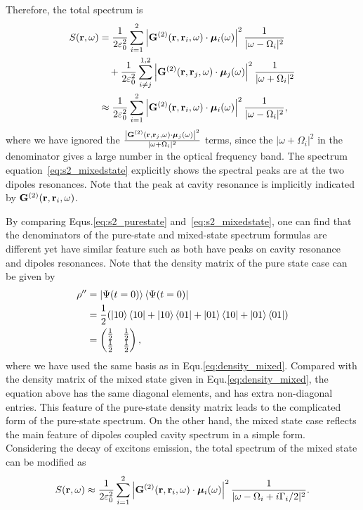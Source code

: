 Therefore, the total spectrum is
\begin{align}
S({\bf r},\omega)&=\frac{1}{2\varepsilon_0^2}\sum_{i=1}^2{\left| \mathbf{G}^{(2)}(\mathbf{r},\mathbf{r}_i,\omega)\cdot {\bm \mu}_i(\omega) \right|^2 \frac{1}{|\omega-\Omega_i|^2}} \nonumber \\
&\quad +\frac{1}{2\varepsilon_0^2}\sum_{i\neq j}^{1,2}{\left| \mathbf{G}^{(2)}(\mathbf{r},\mathbf{r}_j,\omega)\cdot {\bm \mu}_j(\omega) \right|^2 \frac{1}{|\omega+\Omega_i|^2}}\label{eq:s2_mixedstate0}\\
&\approx \frac{1}{2\varepsilon_0^2}\sum_{i=1}^2{\left| \mathbf{G}^{(2)}(\mathbf{r},\mathbf{r}_i,\omega)\cdot {\bm \mu}_i(\omega) \right|^2 \frac{1}{|\omega-\Omega_i|^2}}, \label{eq:s2_mixedstate}
\end{align}
where we have ignored the $\frac{\left| \mathbf{G}^{(2)}(\mathbf{r},\mathbf{r}_j,\omega)\cdot {\bm \mu}_j(\omega) \right|^2}{|\omega+\Omega_i|^2}$ terms, since the $|\omega+\Omega_i|^2$ in the denominator gives a large number in the optical frequency band. The spectrum equation~\ref{eq:s2_mixedstate} explicitly shows the spectral peaks are at the two dipoles resonances. Note that the peak at cavity resonance is implicitly indicated by $\mathbf{G}^{(2)}(\mathbf{r},\mathbf{r}_i,\omega)$.

By comparing Equs.\eqref{eq:s2_purestate} and~\eqref{eq:s2_mixedstate}, one can find that the denominators of the pure-state and mixed-state spectrum formulas are different yet have similar feature such as both have peaks on cavity resonance and dipoles resonances. Note that the density matrix of the pure state case can be given by
\begin{align}
\rho'' &=\mathinner{|{\Psi(t=0)}\rangle}\mathinner{\langle{\Psi(t=0)}|}\\
&=\frac{1}{2}(\mathinner{|{10}\rangle}\mathinner{\langle{10}|}+\mathinner{|{10}\rangle}\mathinner{\langle{01}|}+\mathinner{|{01}\rangle}\mathinner{\langle{10}|}+\mathinner{|{01}\rangle}\mathinner{\langle{01}|})\\
&=\left( \begin{matrix}
        \frac{1}{2} &   \frac{1}{2} \\
        \frac{1}{2}   &   \frac{1}{2} \end{matrix}\right),
\end{align}
where we have used the same basis as in  Equ.\eqref{eq:density_mixed}.
Compared with the density matrix of the mixed state given in Equ.\eqref{eq:density_mixed}, the equation above has the same diagonal elements, and has extra non-diagonal entries. This feature of the pure-state density matrix leads to the complicated form of the pure-state spectrum. On the other hand, the mixed state case reflects the main feature of dipoles coupled cavity spectrum in a simple form. Considering the decay of excitons emission, the total spectrum of the mixed state can be modified as
\begin{equation}
S({\bf r},\omega)\approx \frac{1}{2\varepsilon_0^2}\sum_{i=1}^2{\left| \mathbf{G}^{(2)}(\mathbf{r},\mathbf{r}_i,\omega)\cdot {\bm \mu}_i(\omega) \right|^2 \frac{1}{|\omega-\Omega_i+i\Gamma_i/2|^2}}. \label{eq:s2_mixedstate_withdecay}
\end{equation}

